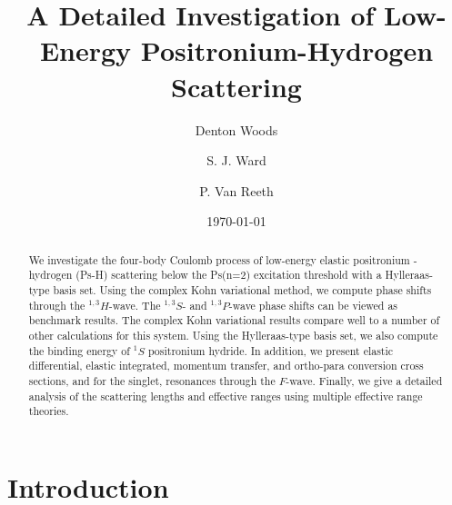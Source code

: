 \documentclass[preprint,showpacs,showkeys,preprintnumbers,amsmath,amssymb,longbibliography,pra,aps]{revtex4-1}
\begin{document}

\title{A Detailed Investigation of Low-Energy Positronium-Hydrogen Scattering}

\author{Denton Woods}

\author{S. J. Ward}

\author{P. Van Reeth}

\date{\today}

\begin{abstract}
We investigate the four-body Coulomb process of low-energy elastic positronium
-hydrogen (Ps-H) scattering below the Ps(n=2) excitation threshold with a 
Hylleraas-type basis set. Using the complex Kohn variational method, we 
compute phase shifts through the $^{1,3}H$-wave. The $^{1,3}S$- and
$^{1,3}P$-wave phase shifts can be viewed as benchmark results. The complex
Kohn variational results compare well to a number of other calculations for 
this system. Using the Hylleraas-type basis set, we also compute the binding 
energy of $^1S$ positronium hydride. In addition, we present elastic 
differential, elastic integrated, momentum transfer, and ortho-para 
conversion cross sections, and for the singlet, resonances through the
$F$-wave. Finally, we give a detailed analysis of the scattering lengths and 
effective ranges using multiple effective range theories.
\end{abstract}

   
\maketitle

\section{\label{sec:Intro}\protect Introduction}


\end{document}

